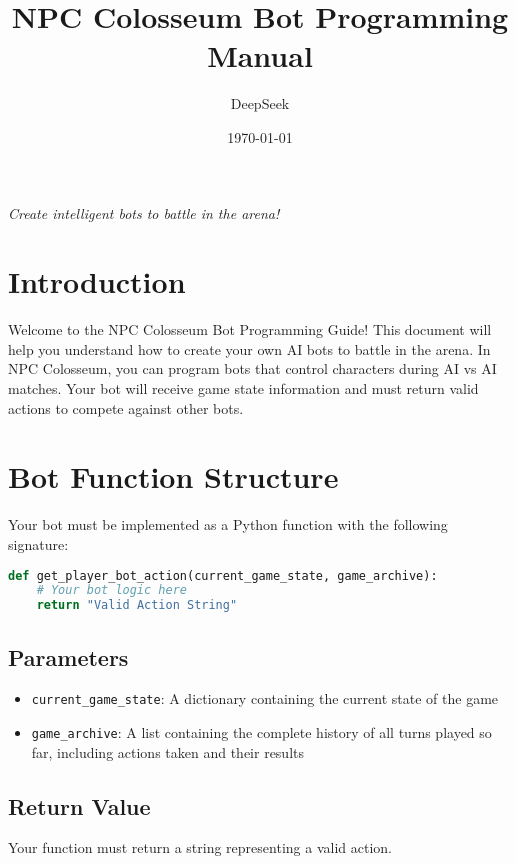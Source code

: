 \documentclass[12pt]{article}
\title{\Huge\textbf{NPC Colosseum Bot Programming Manual}}
\author{DeepSeek}
\date{\today}
\begin{document}
\maketitle

\begin{center}
\textit{Create intelligent bots to battle in the arena!}
\end{center}

\vspace{2em}

\tableofcontents
\newpage

\section{Introduction}
\label{sec:introduction}

Welcome to the NPC Colosseum Bot Programming Guide! This document will help you understand how to create your own AI bots to battle in the arena. In NPC Colosseum, you can program bots that control characters during AI vs AI matches. Your bot will receive game state information and must return valid actions to compete against other bots.

\section{Bot Function Structure}
\label{sec:bot-structure}

Your bot must be implemented as a Python function with the following signature:

\begin{lstlisting}[language=Python, caption=Bot Function Signature]
def get_player_bot_action(current_game_state, game_archive):
    # Your bot logic here
    return "Valid Action String"
\end{lstlisting}

\subsection{Parameters}
\begin{itemize}
    \item \texttt{current\_game\_state}: A dictionary containing the current state of the game
    \item \texttt{game\_archive}: A list containing the complete history of all turns played so far, including actions taken and their results
\end{itemize}

\subsection{Return Value}
Your function must return a string representing a valid action.
\end{document}
